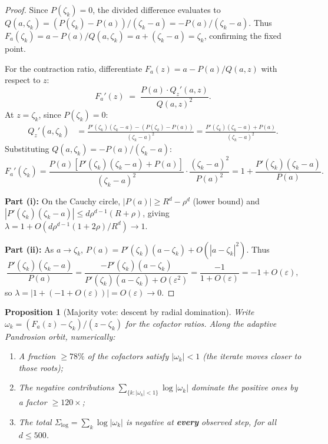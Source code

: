 \documentclass[10pt,a4paper,oneside]{book}
\newtheorem{proposition}[theorem]{Proposition}
\theoremstyle{definition}
\theoremstyle{remark}
\begin{document}
\begin{proof}
Since $P(\zeta_k) = 0$, the divided difference evaluates to $Q(a,\zeta_k) = (P(\zeta_k) - P(a))/(\zeta_k - a) = -P(a)/(\zeta_k - a)$.  Thus $F_a(\zeta_k) = a - P(a)/Q(a,\zeta_k) = a + (\zeta_k - a) = \zeta_k$, confirming the fixed point.

For the contraction ratio, differentiate $F_a(z) = a - P(a)/Q(a,z)$ with respect to $z$:
\[
  F_a'(z) \;=\; \frac{P(a) \cdot Q_z'(a,z)}{Q(a,z)^2}.
\]
At $z = \zeta_k$, since $P(\zeta_k) = 0$:
\begin{align*}
  Q_z'(a,\zeta_k) &= \frac{P'(\zeta_k)(\zeta_k - a) - (P(\zeta_k) - P(a))}{(\zeta_k - a)^2} = \frac{P'(\zeta_k)(\zeta_k - a) + P(a)}{(\zeta_k - a)^2}.
\end{align*}
Substituting $Q(a,\zeta_k) = -P(a)/(\zeta_k - a)$:
\[
  F_a'(\zeta_k) = \frac{P(a)[P'(\zeta_k)(\zeta_k - a) + P(a)]}{(\zeta_k - a)^2} \cdot \frac{(\zeta_k - a)^2}{P(a)^2} = 1 + \frac{P'(\zeta_k)(\zeta_k - a)}{P(a)}.
\]

\textbf{Part (i):} On the Cauchy circle, $|P(a)| \geq R^d - \rho^d$ (lower bound) and $|P'(\zeta_k)(\zeta_k - a)| \leq d\rho^{d-1}(R+\rho)$, giving $\lambda = 1 + O(d\rho^{d-1}(1+2\rho)/R^d) \to 1$.

\textbf{Part (ii):} As $a \to \zeta_k$, $P(a) = P'(\zeta_k)(a - \zeta_k) + O(|a-\zeta_k|^2)$.  Thus
\[
  \frac{P'(\zeta_k)(\zeta_k - a)}{P(a)} = \frac{-P'(\zeta_k)(a - \zeta_k)}{P'(\zeta_k)(a-\zeta_k) + O(\varepsilon^2)} = \frac{-1}{1 + O(\varepsilon)} = -1 + O(\varepsilon),
\]
so $\lambda = |1 + (-1 + O(\varepsilon))| = O(\varepsilon) \to 0$.
\end{proof}

\begin{proposition}[Majority vote: descent by radial domination]
\label{prop:majority_vote}
Write $\omega_k = (F_a(z) - \zeta_k)/(z - \zeta_k)$ for the cofactor ratios.  Along the adaptive Pandrosion orbit, numerically:
\begin{enumerate}
  \item[\textup{(i)}] A fraction $\geq 78\%$ of the cofactors satisfy $|\omega_k| < 1$ (the iterate moves closer to those roots);
  \item[\textup{(ii)}] The negative contributions $\sum_{\{k : |\omega_k|<1\}} \log|\omega_k|$ dominate the positive ones by a factor $\geq 120\times$;
  \item[\textup{(iii)}] The total $\Sigma_{\log} = \sum_k \log|\omega_k|$ is negative at \textbf{every} observed step, for all $d \leq 500$.
\end{enumerate}
\end{proposition}
\end{document}
